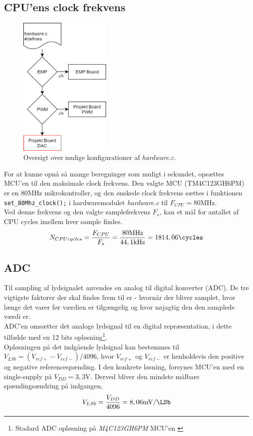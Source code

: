 \subsection{CPU'ens clock frekvens}
\begin{figure}
	\centering
	\includegraphics[width=4.5cm]{billeder/hardware_profiles.png}
	\caption{Oversigt over mulige konfigurationer af \textit{hardware.c}.}
	\label{fig:hardware_profiler}
\end{figure}
For at kunne opnå så mange beregninger som muligt i sekundet, opsættes MCU'en til den maksimale clock frekvens.
Den valgte MCU (TM4C123GH6PM) er en $80\si{\mega\hertz}$ mikrokontroller, og den ønskede clock frekvens sættes i funktionen \texttt{set\_80Mhz\_clock();} i hardwaremodulet \textit{hardware.c} til $F_{CPU} = 80\si{\mega\hertz}$.\\
Ved denne frekvens og den valgte samplefrekvens $F_s$, kan et mål for antallet af CPU cycles imellem hver sample findes.
\begin{align}
N_{CPU cycles} = \frac{F_{CPU}}{F_s}  =  \frac{80\si{\mega\hertz}}{44,1\si{\kilo\hertz}}  = 1814,06 \si{\cycles}
\end{align}

\subsection{ADC}\label{subsec:adc}
Til sampling af lydsignalet anvendes en analog til digital konverter (ADC). 
De tre vigtigste faktorer der skal findes frem til er - hvornår der bliver samplet, hvor længe det varer før værdien er tilgængelig og hvor nøjagtig den den samplede værdi er.\\

ADC'en omsætter det analoge lydsignal til en digital repræsentation, i dette tilfælde med en 12 bits opløsning\footnote{Stadard ADC opløsning på \textit{M4C123GH6PM} MCU'en \cite[s. 797]{tm4c123gh6pm}}.\\
Opløsningen på det indgående lydsignal kan bestemmes til $V_{LSb} = (V_{ref+} - V_{ref-} ) / 4096 $, hvor $V_{ref+}$ og $V_{ref-}$ er henholdsvis den positive og negative referencespænding.
I den konkrete løsning, forsynes MCU'en med en single-supply på $V_{DD} = 3,3\si{\volt}$.
Derved bliver den mindste målbare spændingsændring på indgangen,
\begin{align}
V_{LSb} = \frac{V_{DD}}{4096} = 8,06\si{\milli\volt\per\LSb}
\end{align}

